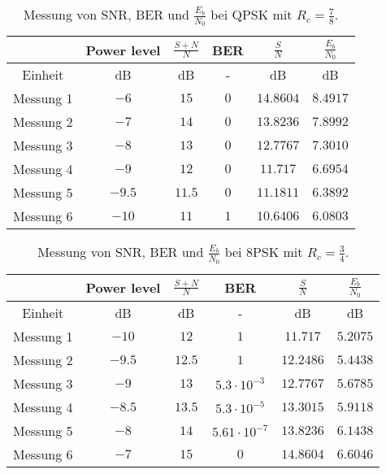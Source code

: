 \documentclass[12pt,a4paper,ngerman]{article}
\begin{document}
\begin{center}
\begin{table}[h!]
\centering


\begin{tabular}{ |c|c|c|c|c|c| }
  \hline
    & Power level & $\frac{S+N}{N}$ & BER & $\frac{S}{N}$ & $\frac{E_b}{N_0}$\\
  \hline
  Einheit & dB & dB & - & dB & dB \\
  \hline
  Messung 1 & $-6$ & $15$ & $0$ & $14.8604$ & $8.4917$ \\
  \hline
    Messung 2 & $-7$ & $14$ & $0$ & $13.8236$ & $7.8992$ \\
  \hline
    Messung 3 & $-8$ & $13$ & $0$ & $12.7767$ & $7.3010$ \\
  \hline
    Messung 4 & $-9$ & $12$ & $0$ & $11.717$ & $6.6954$ \\
  \hline
    Messung 5 & $-9.5$ & $11.5$ & $0$ & $11.1811$ & $6.3892$ \\
  \hline
    Messung 6 & $-10$ & $11$ & $1$ & $10.6406$ & $6.0803$ \\
  \hline    
\end{tabular}
\caption{Messung von SNR, BER und $\frac{E_b}{N_0}$ bei QPSK mit $R_c = \frac{7}{8}$.\label{tab:qpsk_7_8}}
\end{table}

\end{center}

\begin{center}
\begin{table}[h!]

\centering

\begin{tabular}{ |c|c|c|c|c|c| }
  \hline
    & Power level & $\frac{S+N}{N}$ & BER & $\frac{S}{N}$ & $\frac{E_b}{N_0}$\\
  \hline
  Einheit & dB & dB & - & dB & dB \\
  \hline
  Messung 1 & $-10$ & $12$ & $1$ & $11.717$ & $5.2075$ \\
  \hline
    Messung 2 & $-9.5$ & $12.5$ & $1$ & $12.2486$ & $5.4438$ \\
  \hline
    Messung 3 & $-9$ & $13$ & $5.3\cdot10^{-3}$ & $12.7767$ & $5.6785$ \\
  \hline
    Messung 4 & $-8.5$ & $13.5$ & $5.3\cdot10^{-5}$ & $13.3015$ & $5.9118$ \\
  \hline
    Messung 5 & $-8$ & $14$ & $5.61\cdot10^{-7}$ & $13.8236$ & $6.1438$ \\
  \hline
    Messung 6 & $-7$ & $15$ & $0$ & $14.8604$ & $6.6046$ \\
  \hline    
\end{tabular}
\caption{Messung von SNR, BER und $\frac{E_b}{N_0}$ bei 8PSK mit $R_c = \frac{3}{4}$.\label{tab:qpsk_7_8}}
\end{table}

\end{center}
\pagebreak
\end{document}
